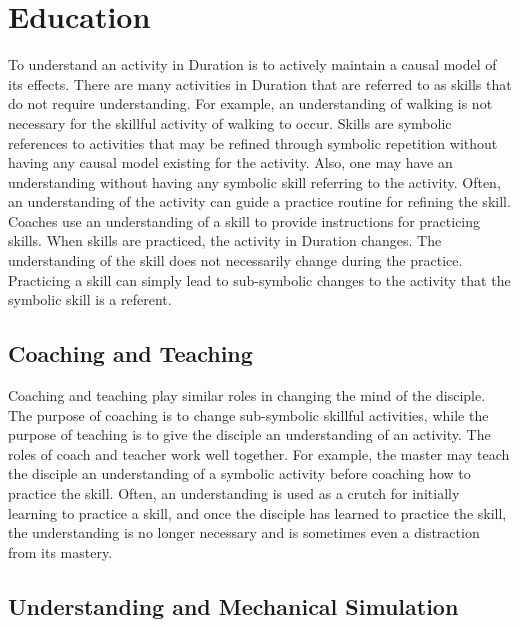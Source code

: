 \chapter{Education}
\label{chapter:education}


To understand an activity in Duration is to actively maintain a causal
model of its effects.  There are many activities in Duration that are
referred to as skills that do not require understanding.  For example,
an understanding of walking is not necessary for the skillful activity
of walking to occur.  Skills are symbolic references to activities
that may be refined through symbolic repetition without having any
causal model existing for the activity.  Also, one may have an
understanding without having any symbolic skill referring to the
activity.  Often, an understanding of the activity can guide a
practice routine for refining the skill.  Coaches use an understanding
of a skill to provide instructions for practicing skills.  When skills
are practiced, the activity in Duration changes.  The understanding of
the skill does not necessarily change during the practice.  Practicing
a skill can simply lead to sub-symbolic changes to the activity that
the symbolic skill is a referent.

\section{Coaching and Teaching}

Coaching and teaching play similar roles in changing the mind of the
disciple.  The purpose of coaching is to change sub-symbolic skillful
activities, while the purpose of teaching is to give the disciple an
understanding of an activity.  The roles of coach and teacher work
well together.  For example, the master may teach the disciple an
understanding of a symbolic activity before coaching how to practice
the skill.  Often, an understanding is used as a crutch for initially
learning to practice a skill, and once the disciple has learned to
practice the skill, the understanding is no longer necessary and is
sometimes even a distraction from its mastery.

\section{Understanding and Mechanical Simulation}


